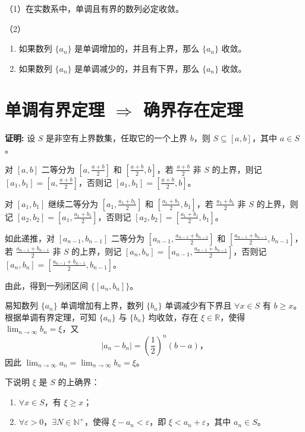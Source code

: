 \documentclass[lang=cn,newtx,10pt,scheme=chinese]{elegantbook}
\begin{document}
\begin{theorem}[单调有界定理] \label{thm:fubi2}
（1）在实数系中，单调且有界的数列必定收敛。

（2）\begin{enumerate}
    \item 如果数列 $\{a_n\}$ 是单调增加的，并且有上界，那么 $\{a_n\}$ 收敛。
    \item 如果数列 $\{a_n\}$ 是单调减少的，并且有下界，那么 $\{a_n\}$ 收敛。
\end{enumerate}

\end{theorem}

\section*{单调有界定理 $\Rightarrow$ 确界存在定理}

\textbf{证明:} 设 $S$ 是非空有上界数集，任取它的一个上界 $b$，则 $S \subseteq [a, b]$，其中 $a \in S$。

对 $[a, b]$ 二等分为 $\left[ a, \frac{a + b}{2} \right]$ 和 $\left[ \frac{a + b}{2}, b \right]$，若 $\frac{a + b}{2}$ 非 $S$ 的上界，则记 $[a_1, b_1] = \left[ a, \frac{a + b}{2} \right]$，否则记 $[a_1, b_1] = \left[ \frac{a + b}{2}, b \right]$。

对 $[a_1, b_1]$ 继续二等分为 $\left[ a_1, \frac{a_1 + b_1}{2} \right]$ 和 $\left[ \frac{a_1 + b_1}{2}, b_1 \right]$，若 $\frac{a_1 + b_1}{2}$ 非 $S$ 的上界，则记 $[a_2, b_2] = \left[ a_1, \frac{a_1 + b_1}{2} \right]$，否则记 $[a_2, b_2] = \left[ \frac{a_1 + b_1}{2}, b_1 \right]$。

如此递推，对 $[a_{n-1}, b_{n-1}]$ 二等分为 $\left[ a_{n-1}, \frac{a_{n-1} + b_{n-1}}{2} \right]$ 和 $\left[ \frac{a_{n-1} + b_{n-1}}{2}, b_{n-1} \right]$，若 $\frac{a_{n-1} + b_{n-1}}{2}$ 非 $S$ 的上界，则记 $[a_n, b_n] = \left[ a_{n-1}, \frac{a_{n-1} + b_{n-1}}{2} \right]$，否则记 $[a_n, b_n] = \left[ \frac{a_{n-1} + b_{n-1}}{2}, b_{n-1} \right]$。

由此，得到一列闭区间 $\{[a_n, b_n]\}$。

易知数列 $\{a_n\}$ 单调增加有上界，数列 $\{b_n\}$ 单调减少有下界且 $\forall x \in S$ 有 $b \geq x$。根据单调有界定理，可知 $\{a_n\}$ 与 $\{b_n\}$ 均收敛，存在 $\xi \in \mathbb{R}$，使得 $\lim_{n \to \infty} b_n =  \xi $，又
\[
|a_n - b_n| = \left( \frac{1}{2} \right)^n (b - a)，
\]
因此 $\lim_{n \to \infty} a_n = \lim_{n \to \infty} b_n =  \xi $。

下说明 $\xi $ 是 $S$ 的上确界：
\begin{enumerate}
    \item $\forall x \in S$，有 $\xi  \geq x$；
    \item $\forall \varepsilon > 0$，$\exists N \in \mathbb{N}^{+}$，使得 $\xi - a_n < \varepsilon$，即 $\xi < a_n + \varepsilon$，其中 $a_n \in S$。
\end{enumerate}
\end{document}
